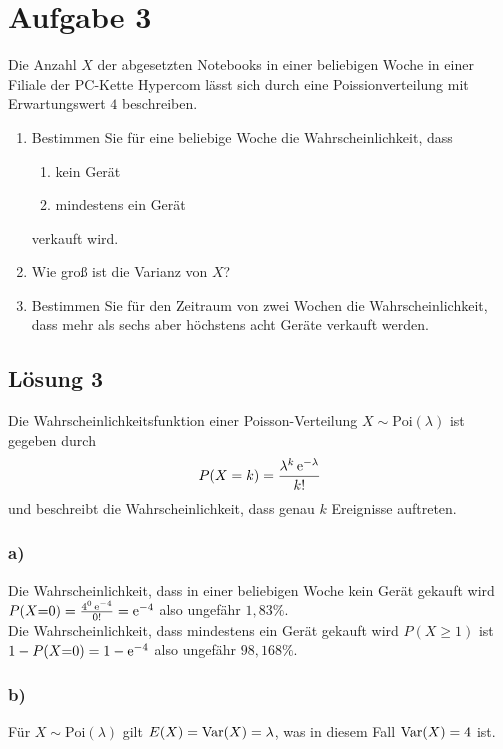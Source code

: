 \documentclass[main.tex]{subfiles}
\begin{document}
\section{Aufgabe 3}
Die Anzahl $X$ der abgesetzten Notebooks in einer beliebigen Woche in einer Filiale der PC-Kette Hypercom lässt sich durch eine Poissionverteilung mit Erwartungswert $4$ beschreiben.
\begin{enumerate}
\item Bestimmen Sie für eine beliebige Woche die Wahrscheinlichkeit, dass
\begin{enumerate}
\item kein Gerät
\item mindestens ein Gerät
\end{enumerate}
verkauft wird.
\item Wie groß ist die Varianz von $X$?
\item Bestimmen Sie für den Zeitraum von zwei Wochen die Wahrscheinlichkeit, dass mehr als sechs aber höchstens acht Geräte verkauft werden.
\end{enumerate}

\subsection{Lösung 3}
Die Wahrscheinlichkeitsfunktion einer Poisson-Verteilung $X\sim \text{Poi}(\lambda)$ ist gegeben durch $$
P(X = k) = \frac{{\lambda^k \operatorname{\mathrm{e}}^{-\lambda}}}{{k!}}
$$ und beschreibt die Wahrscheinlichkeit, dass genau $k$ Ereignisse auftreten.

\subsubsection{a)}
Die Wahrscheinlichkeit, dass in einer beliebigen Woche kein Gerät gekauft wird $P(X{=}0)=\frac{4^0 \operatorname{\mathrm{e}}^{-4}}{0!}= \operatorname{\mathrm{e}}^{-4}$ also ungefähr $1,83\%$.\\

Die Wahrscheinlichkeit, dass mindestens ein Gerät gekauft wird $P(X\geq 1)$ ist $1-P(X{=}0) = 1 - \operatorname{\mathrm{e}}^{-4}$ also ungefähr $98,168 \%$.

\subsubsection{b)}
Für $X\sim \text{Poi}(\lambda)$ gilt $E(X) = \operatorname{Var}(X) = \lambda$, was in diesem Fall $\operatorname{Var}(X) = 4$ ist.
\end{document}
